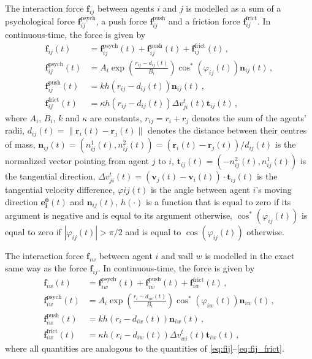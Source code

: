 The interaction force $\bm{f}_{ij}$ between agents $i$ and $j$ is modelled as a sum of a psychological force $\bm{f}_{ij}^{\mathrm{psych}}$, a push force $\bm{f}_{ij}^{\mathrm{push}}$ and a friction force $\bm{f}_{ij}^{\mathrm{frict}}$. In continuous-time, the force is given by
\begin{subequations}
\begin{align} 
	\bm{f}_{ij}(t) & = \bm{f}_{ij}^{\mathrm{psych}}(t) + \bm{f}_{ij}^{\mathrm{push}}(t) + \bm{f}_{ij}^{\mathrm{frict}}(t) \,, \label{eq:fij} \\
	\bm{f}_{ij}^{\mathrm{psych}}(t) & = A_i \exp\left(\frac{r_{ij}-d_{ij}(t)}{B_i}\right) \cos^*(\varphi_{ij}(t)) \bm{n}_{ij}(t) \,, \label{eq:fij_psych} \\
	\bm{f}_{ij}^{\mathrm{push}}(t) & = k h(r_{ij}-d_{ij}(t)) \bm{n}_{ij}(t) \,, \label{eq:fij_pusj} \\
	\bm{f}_{ij}^{\mathrm{frict}}(t) & = \kappa h(r_{ij}-d_{ij}(t)) \Delta v_{ji}^t(t) \bm{t}_{ij}(t) \,, \label{eq:fij_frict}
\end{align}
\end{subequations}
where $A_i$, $B_i$, $k$ and $\kappa$ are constants, $r_{ij}=r_i+r_j$ denotes the sum of the agents' radii, $d_{ij}(t)=\lVert \bm{r}_i(t)-\bm{r}_j(t) \rVert$ denotes the distance between their centres of mass, $\bm{n}_{ij}(t)=(n_{ij}^1(t),n_{ij}^2(t))=(\bm{r}_i(t)-\bm{r}_j(t))/d_{ij}(t)$ is the normalized vector pointing from agent $j$ to $i$, $\bm{t}_{ij}(t)=(-n_{ij}^2(t),n_{ij}^1(t))$ is the tangential direction, $\Delta v_{ji}^t(t)=(\bm{v}_j(t)-\bm{v}_i(t))\cdot\bm{t}_{ij}(t)$ is the tangential velocity difference, $\varphi{ij}(t)$ is the angle between agent $i$'s moving direction $\bm{e_i^0}(t)$ and $\bm{n}_{ij}(t)$, $h(\cdot)$ is a function that is equal to zero if its argument is negative and is equal to its argument otherwise, $\cos^*(\varphi_{ij}(t))$ is equal to zero if $|\varphi_{ij}(t)| > \pi/2$ and is equal to $\cos(\varphi_{ij}(t))$ otherwise. 

The interaction force $\bm{f}_{iw}$ between agent $i$ and wall $w$ is modelled in the exact same way as the force $\bm{f}_{ij}$. In continuous-time, the force is given by
\begin{subequations}
\begin{align}
	\bm{f}_{iw}(t) & = \bm{f}_{iw}^{\mathrm{psych}}(t) + \bm{f}_{iw}^{\mathrm{push}}(t) + \bm{f}_{iw}^{\mathrm{frict}}(t) \,, \label{eq:fiw} \\
	\bm{f}_{iw}^{\mathrm{psych}}(t) & = A_i \exp\left(\frac{r_{i}-d_{iw}(t)}{B_i}\right) \cos^*(\varphi_{iw}(t)) \bm{n}_{iw}(t) \,, \label{eq:fiw_psych} \\
	\bm{f}_{iw}^{\mathrm{push}}(t) & = k h(r_{i}-d_{iw}(t)) \bm{n}_{iw}(t) \,, \label{eq:fiw_push} \\ 
	\bm{f}_{iw}^{\mathrm{frict}}(t) & = \kappa h(r_{i}-d_{iw}(t)) \Delta v_{wi}^t(t) \bm{t}_{iw}(t) \,, \label{eq:fiw_frict}
\end{align}
\end{subequations}
where all quantities are analogous to the quantities of \eqref{eq:fij}--\eqref{eq:fij_frict}.

